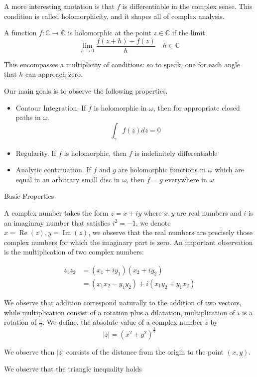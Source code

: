 \documentclass[11pt,twoside]{book}
\newcommand{\goesto}{\rightarrow}
\newcommand{\CC}{\mathbb{C}}
\begin{document}
A more interesting anotation is that $f$ is differentiable in the complex sense. This condition is called holomorphicity, and it shapes all of complex analysis.

A function $f:\mathbb{C} \goesto \mathbb{C}$ is holomorphic at the point $z \in \mathbb{C}$ if the limit
\[
	\lim_{h \goesto 0} \frac{f(z+h)-f(z)}{h} \quad h \in \CC
\]

This encompasses a multiplicity of conditions: so to speak, one for each angle that $h$ can approach zero.

Our main goals is to observe the following properties.

\begin{itemize}
	\item Contour Integration. If $f$ is holomorphic in $\omega$, then for appropriate closed paths in $\omega$.
	\[
		\int_\gamma f(z) dz = 0
	\]
	\item Regularity. If $f$ is holomorphic, then $f$ is indefinitely differentiable
	\item Analytic continuation. If $f$ and $g$ are holomorphic functions in $\omega$ which are equal in an arbitrary small disc in $\omega$, then $f = g$ everywhere in $\omega$
\end{itemize}

Basic Properties

A complex number takes the form $z = x + iy$ where $x,y $ are real numbers and $i$ is an imaginray number that satisfies $i^2 = -1$, we denote $x = \operatorname{Re}(z), y = \operatorname{Im}(z) $, we observe that the real numbers are precisely those complex numbers for which the imaginary part is zero.
An important observation is the multiplication of two complex numbers:

\begin{align*}
	z_1 z_2 &= (x_1 + i y_1)(x_2 + i y_2) \\
			&= (x_1x_2 - y_1y_2) + i(x_1y_2 + y_1x_2)
\end{align*}

We observe that addition correspond naturally to the addition of two vectors, while multiplication consist of a rotation plus a dilatation, multiplication of $i$ is a rotation of $\frac{\pi}{2}$. We define, the absolute value of a complex number $z$ by
\[
	|z| = (x^2 + y^2)^{\frac{1}{2}}
\]

We observe then $|z|$ consists of the distance from the origin to the point $(x,y)$.

We observe that the triangle inequality holds
\end{document}
